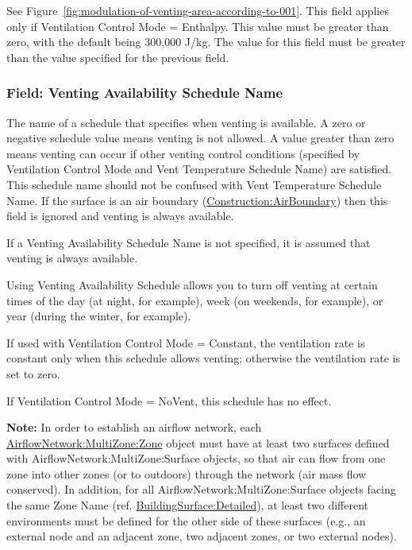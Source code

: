 See Figure~\ref{fig:modulation-of-venting-area-according-to-001}. This field applies only if Ventilation Control Mode = Enthalpy. This value must be greater than zero, with the default being 300,000 J/kg. The value for this field must be greater than the value specified for the previous field.

\subsubsection{Field: Venting Availability Schedule Name}\label{field-venting-availability-schedule-name-1}

The name of a schedule that specifies when venting is available. A zero or negative schedule value means venting is not allowed. A value greater than zero means venting can occur if other venting control conditions (specified by Ventilation Control Mode and Vent Temperature Schedule Name) are satisfied. This schedule name should not be confused with Vent Temperature Schedule Name.  If the surface is an air boundary (\hyperref[constructionairboundary]{Construction:AirBoundary}) then this field is ignored and venting is always available.

If a Venting Availability Schedule Name is not specified, it is assumed that venting is always available.

Using Venting Availability Schedule allows you to turn off venting at certain times of the day (at night, for example), week (on weekends, for example), or year (during the winter, for example).

If used with Ventilation Control Mode = Constant, the ventilation rate is constant only when this schedule allows venting; otherwise the ventilation rate is set to zero.

If Ventilation Control Mode = NoVent, this schedule has no effect.

\textbf{Note:} In order to establish an airflow network, each \hyperref[airflownetworkmultizonezone]{AirflowNetwork:MultiZone:Zone} object must have at least two surfaces defined with AirflowNetwork:MultiZone:Surface objects, so that air can flow from one zone into other zones (or to outdoors) through the network (air mass flow conserved). In addition, for all AirflowNetwork:MultiZone:Surface objects facing the same Zone Name (ref. \hyperref[buildingsurfacedetailed]{BuildingSurface:Detailed}), at least two different environments must be defined for the other side of these surfaces (e.g., an external node and an adjacent zone, two adjacent zones, or two external nodes).

